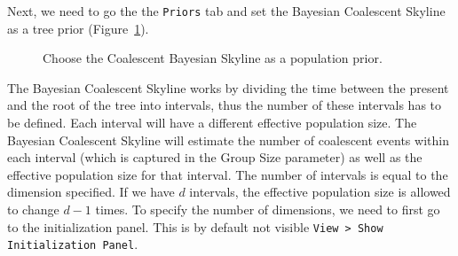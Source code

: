 \documentclass[11pt]{article}
\newcommand{\fixme}[1]{\textcolor{red}{\texttt{{\bf FIX ME:} #1}}}
\begin{document}

Next, we need to go the the \texttt{Priors} tab and set the Bayesian Coalescent Skyline as a tree prior (Figure~\ref{fig:coalescent}).

\begin{figure}[h!]
\centering
{}
\caption{\small Choose the Coalescent Bayesian Skyline as a population prior.}
\label{fig:coalescent}
\end{figure}

The Bayesian Coalescent Skyline works by dividing the time between the present and the root of the tree into intervals, thus the number of these intervals has to be defined. Each interval will have a different effective population size. 
The Bayesian Coalescent Skyline will estimate the number of coalescent events within each interval (which is captured in the Group Size parameter) as well as the effective population size for that interval. The number of intervals is equal to the dimension specified. If we have $d$ intervals, the effective population size is allowed to change $d-1$ times. To specify the number of dimensions, we need to first go to the initialization panel. This is by default not visible \texttt{View > Show Initialization Panel}.


\end{document}
